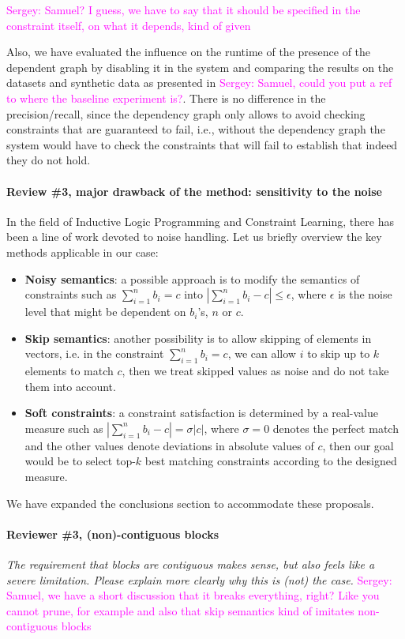 \documentclass{article}
\newcommand{\sergey}[1]{\textcolor{magenta}{{\sc Sergey:} #1}\xspace}
\begin{document}
\sergey{Samuel? I guess, we have to say that it should be specified in the constraint itself, on what it depends, kind of given}~


Also, we have evaluated the influence on the runtime of the presence of the dependent graph by disabling it in the system and comparing the results on the datasets and synthetic data as presented in \sergey{Samuel, could you put a ref to where the baseline experiment is?}. There is no difference in the precision/recall, since the dependency graph only allows to avoid checking constraints that are guaranteed to fail, i.e., without the dependency graph the system would have to check the constraints that will fail to establish that indeed they do not hold.


\paragraph{Review \#3, major drawback of the method: sensitivity to the noise}
In the field of Inductive Logic Programming and Constraint Learning, there has been a line of work devoted to noise handling. Let us briefly overview the key methods applicable in our case:
\begin{itemize}
  \item \textbf{Noisy semantics}: a possible approach is to modify the semantics of constraints such as $\sum_{i=1}^n b_i = c$ into $|\sum_{i=1}^n b_i - c| \leq \epsilon$, where $\epsilon$ is the noise level that might be dependent on $b_i$'s, $n$ or $c$.
  \item \textbf{Skip semantics}: another possibility is to allow skipping of elements in vectors, i.e. in the constraint  $\sum_{i=1}^n b_i = c$, we can allow $i$ to skip up to $k$ elements to match $c$, then we treat skipped values as noise and do not take them into account.
  \item \textbf{Soft constraints}: a constraint satisfaction is determined by a real-value measure such as $|\sum_{i=1}^n b_i - c | = \sigma|c|$, where $\sigma=0$ denotes the perfect match and the other values denote deviations in absolute values of $c$, then our goal would be to select top-$k$ best matching constraints according to the designed measure.
\end{itemize}

We have expanded the conclusions section to accommodate these proposals.

\paragraph{Reviewer \#3, (non)-contiguous blocks} \textit{
The requirement that blocks are contiguous makes sense, but also feels like a severe limitation. Please explain more clearly why this is (not) the case.}
\sergey{Samuel, we have a short discussion that it breaks everything, right? Like you cannot prune, for example and also that skip semantics kind of imitates non-contiguous blocks}



\end{document}

